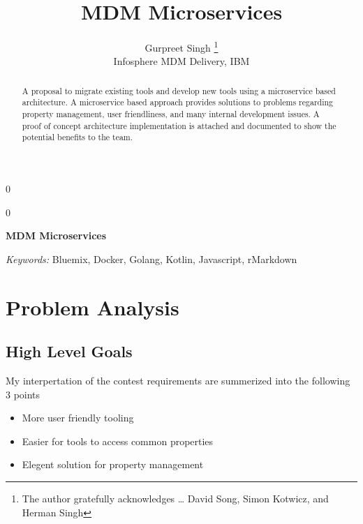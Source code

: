 \documentclass[12pt]{article}
\newcommand{\blind}{0}
\begin{document}
\def\spacingset#1{\renewcommand{\baselinestretch}%
{#1}\small\normalsize} \spacingset{1}



\blind
{
  \title{\bf MDM Microservices}

  \author{
        Gurpreet Singh \thanks{The author gratefully acknowledges \ldots{} David Song, Simon Kotwicz,
and Herman Singh} \\
    Infosphere MDM Delivery, IBM\\
      }
  \maketitle
} \fi

\blind
{
  \bigskip
  \bigskip
  \bigskip
  \begin{center}
    {\LARGE\bf MDM Microservices}
  \end{center}
  \medskip
} \fi

\bigskip
\begin{abstract}
A proposal to migrate existing tools and develop new tools using a
microservice based architecture. A microservice based approach provides
solutions to problems regarding property management, user friendliness,
and many internal development issues. A proof of concept architecture
implementation is attached and documented to show the potential benefits
to the team.
\end{abstract}

\noindent%
{\it Keywords:} Bluemix, Docker, Golang, Kotlin, Javascript, rMarkdown
\vfill

\newpage
\spacingset{1.45} %

\def\tightlist{}

\section{Problem Analysis}\label{problem-analysis}

\subsection{High Level Goals}\label{high-level-goals}

My interpertation of the contest requirements are summerized into the
following 3 points

\begin{itemize}
\item
  More user friendly tooling
\item
  Easier for tools to access common properties
\item
  Elegent solution for property management
\end{itemize}
\end{document}
